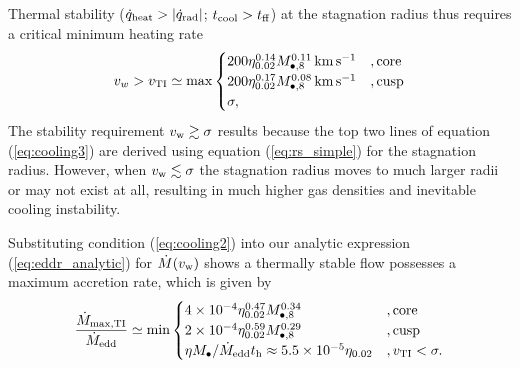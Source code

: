 \documentclass[usenatbib,fleqn]{mn2e}
\begin{document}
Thermal stability ($\dot{q}_{\rm heat} > |\dot{q}_{\rm rad}|$; $t_{\rm cool} > t_{\rm ff}$) at the stagnation radius thus requires a critical minimum heating rate
\begin{align}
v_{w} > v_{\rm TI} \simeq
  {\rm max}\begin{cases}
   200 \eta_{0.02}^{0.14} M_{\bullet,8}^{0.11}\,{\rm km\,s^{-1}}  &, \text{core}\\
   200 \eta_{0.02}^{0.17} M_{\bullet,8}^{0.08}\,{\rm km\,s^{-1}}   &, \text{cusp}\\
\sigma,     
  \end{cases}
  \label{eq:cooling3}
\end{align}
The stability requirement $v_{\rm w} \gtrsim \sigma$ results because the top two lines of equation (\ref{eq:cooling3}) are derived using equation (\ref{eq:rs_simple}) for the stagnation radius.  However, when $v_{\rm w} \lesssim \sigma$ the stagnation radius moves to much larger radii or may not exist at all, resulting in much higher gas densities and inevitable cooling instability. 

Substituting condition (\ref{eq:cooling2}) into our analytic expression (\ref{eq:eddr_analytic}) for $\dot{M}(v_{\rm w})$ shows a thermally stable flow possesses a maximum accretion rate, which is given by
\begin{align}
\frac{\dot{M}_{\rm max,TI}}{\dot{M}_{\rm edd}} \simeq
  {\rm min}\begin{cases}
   4\times 10^{-4} \eta_{0.02}^{0.47} M_{\bullet,8}^{0.34} &, \text{core}\\
   2\times 10^{-4} \eta_{0.02}^{0.59} M_{\bullet,8}^{0.29}    &, \text{cusp}\\
\eta M_{\bullet}/\dot{M}_{\rm edd}t_{\rm h} \approx 5.5\times 10^{-5}\eta_{0.02}&, v_{\rm TI} < \sigma.
  \end{cases}
  \label{eq:Mdotmax}
\end{align}



\end{document}
